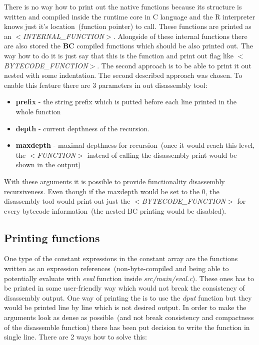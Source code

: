 \documentclass[thesis=M,english]{FITthesis}[2018/10/20]
\begin{document}
There is no way how to print out the native functions because its structure is written and compiled inside the runtime core in C language and the R interpreter knows just it's location~(function pointer) to call. These functions are printed as an \textit{$<$INTERNAL{\_}FUNCTION$>$}. Alongside of these internal functions there are also stored the \textbf{BC} compiled functions which should be also printed out. The way how to do it is just say that this is the function and print out flag like \textit{$<$BYTECODE{\_}FUNCTION$>$}. The second approach is to be able to print it out nested with some indentation. The second described approach was chosen. To enable this feature there are 3 parameters in out disassembly tool:

\begin{itemize}
	\item \textbf{prefix} - the string prefix which is putted before each line printed in the whole function
	
	\item \textbf{depth} - current depthness of the recursion.
 	
	\item \textbf{maxdepth} - maximal depthness for recursion~(once it would reach this level, the \textit{$<$FUNCTION$>$} instead of calling the disassembly print would be shown in the output)
\end{itemize}

With these arguments it is possible to provide functionality disassembly recursiveness. Even though if the maxdepth would be set to the 0, the disassembly tool would print out just the \textit{$<$BYTECODE{\_}FUNCTION$>$} for every bytecode information~(the nested BC printing would be disabled).

\subsection{Printing functions}

One type of the constant expressions in the constant array are the functions written as an expression references~(non-byte-compiled and being able to potentially evaluate with \textit{eval} function inside \textit{src/main/eval.c}). These ones has to be printed in some user-friendly way which would not break the consistency of disassembly output. One way of printing the is to use the \textit{dput} function but they would be printed line by line which is not desired output. In order to make the arguments look as dense as possible~(and not break consistency and compactness of the disassemble function) there has been put decision to write the function in single line. There are 2 ways how to solve this:
\end{document}
